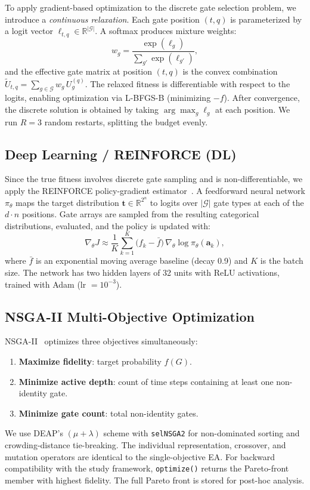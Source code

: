 \documentclass[twocolumn,11pt]{article}
\begin{document}
To apply gradient-based optimization to the discrete gate selection problem, we
introduce a \emph{continuous relaxation}.  Each gate position $(t, q)$ is
parameterized by a logit vector $\boldsymbol{\ell}_{t,q} \in \mathbb{R}^{|\mathcal{G}|}$.
A softmax produces mixture weights:
\begin{equation}
    w_g = \frac{\exp(\ell_g)}{\sum_{g'} \exp(\ell_{g'})},
\end{equation}
and the effective gate matrix at position $(t,q)$ is the convex combination
$\tilde{U}_{t,q} = \sum_{g \in \mathcal{G}} w_g \, U_g^{(q)}$.
The relaxed fitness is differentiable with respect to the logits, enabling
optimization via L-BFGS-B (minimizing $-f$).  After convergence, the discrete
solution is obtained by taking $\arg\max_g \ell_g$ at each position.  We run
$R{=}3$ random restarts, splitting the budget evenly.

\subsection{Deep Learning / REINFORCE (DL)}

Since the true fitness involves discrete gate sampling and is
non-differentiable, we apply the REINFORCE policy-gradient
estimator~\cite{williams1992simple}.  A feedforward neural network
$\pi_\theta$ maps the target distribution $\mathbf{t} \in \mathbb{R}^{2^n}$ to
logits over $|\mathcal{G}|$ gate types at each of the $d \cdot n$ positions.
Gate arrays are sampled from the resulting categorical distributions, evaluated,
and the policy is updated with:
\begin{equation}
    \nabla_\theta J \approx \frac{1}{K}\sum_{k=1}^{K}
    \bigl(f_k - \bar{f}\bigr)\,\nabla_\theta \log \pi_\theta(\mathbf{a}_k),
\end{equation}
where $\bar{f}$ is an exponential moving average baseline (decay 0.9) and $K$
is the batch size.  The network has two hidden layers of 32 units with ReLU
activations, trained with Adam (lr $= 10^{-3}$).

\subsection{NSGA-II Multi-Objective Optimization}

NSGA-II~\cite{deb2002nsga2} optimizes three objectives simultaneously:
\begin{enumerate}[nosep]
    \item \textbf{Maximize fidelity}: target probability $f(G)$.
    \item \textbf{Minimize active depth}: count of time steps containing at
          least one non-identity gate.
    \item \textbf{Minimize gate count}: total non-identity gates.
\end{enumerate}
We use DEAP's $(\mu + \lambda)$ scheme with \texttt{selNSGA2} for
non-dominated sorting and crowding-distance tie-breaking.  The individual
representation, crossover, and mutation operators are identical to the
single-objective EA.  For backward compatibility with the study framework,
\texttt{optimize()} returns the Pareto-front member with highest fidelity.  The
full Pareto front is stored for post-hoc analysis.
\end{document}
